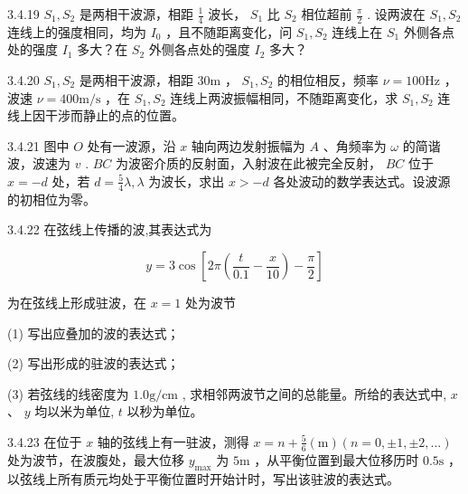 \begin{problem}{3.4.19}
$S_{1}, S_{2}$ 是两相干波源，相距 $\frac{1}{4}$ 波长， $S_{1}$ 比 $S_{2}$ 相位超前 $\frac{\pi}{2}$ . 设两波在 $S_{1}, S_{2}$ 连线上的强度相同，均为 $I_{0}$ ，且不随距离变化，问 $S_{1}, S_{2}$ 连线上在 $S_{1}$ 外侧各点处的强度 $I_{1}$ 多大？在 $S_{2}$ 外侧各点处的强度 $I_{2}$ 多大？
\begin{center}

\end{center}
\end{problem}
\clearpage


\begin{problem}{3.4.20}
$S_{1}, S_{2}$ 是两相干波源，相距 $30\mathrm{m}$ ， $S_{1}, S_{2}$ 的相位相反，频率 $\nu = 100\mathrm{Hz}$ ，波速 $\nu = 400\mathrm{m/s}$ ，在 $S_{1}, S_{2}$ 连线上两波振幅相同，不随距离变化，求 $S_{1}, S_{2}$ 连线上因干涉而静止的点的位置。
\end{problem}
\clearpage


\begin{problem}{3.4.21}
图中 $O$ 处有一波源，沿 $x$ 轴向两边发射振幅为 $A$ 、角频率为 $\omega$ 的简谐波，波速为 $v$ . $BC$ 为波密介质的反射面，入射波在此被完全反射， $BC$ 位于 $x = -d$ 处，若 $d = \frac{5}{4}\lambda, \lambda$ 为波长，求出 $x > -d$ 各处波动的数学表达式。设波源的初相位为零。
\begin{center}

\end{center}
\end{problem}
\clearpage


\begin{problem}{3.4.22}
在弦线上传播的波,其表达式为

\[
y = 3 \cos \left[ 2 \pi \left(\frac {t}{0 . 1} - \frac {x}{1 0}\right) - \frac {\pi}{2} \right]
\]

为在弦线上形成驻波，在 $x = 1$ 处为波节

(1) 写出应叠加的波的表达式；

(2) 写出形成的驻波的表达式；

(3) 若弦线的线密度为 $1.0\mathrm{g/cm}$ , 求相邻两波节之间的总能量。所给的表达式中, $x$ 、 $y$ 均以米为单位, $t$ 以秒为单位。
\end{problem}
\clearpage


\begin{problem}{3.4.23}
在位于 $x$ 轴的弦线上有一驻波，测得 $x = n + \frac{5}{6} (\mathrm{m}) (n = 0, \pm 1, \pm 2, \dots)$ 处为波节，在波腹处，最大位移 $y_{\max}$ 为 $5\mathrm{m}$ ，从平衡位置到最大位移历时 $0.5\mathrm{s}$ ，以弦线上所有质元均处于平衡位置时开始计时，写出该驻波的表达式。
\end{problem}
\clearpage


